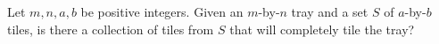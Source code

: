   Let $m,n,a,b$ be positive integers.
  Given an $m$-by-$n$ tray
  and a set $S$ of $a$-by-$b$ tiles, 
  is there a collection of tiles from $S$
  that will completely tile the tray?
